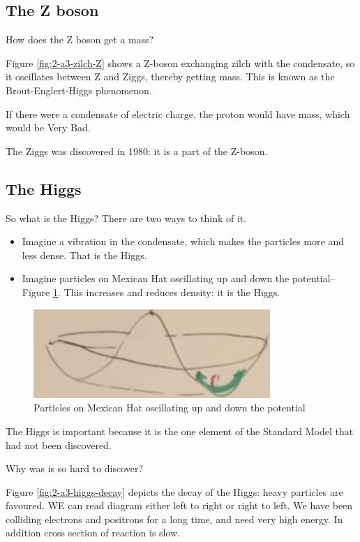 \documentclass[]{article}
\begin{document}
\begin{appendices}
	\subsection{The Z boson}
	
	How does the Z boson get a mass?
	
	Figure \ref{fig:2-a3-zilch-Z} shows a Z-boson exchanging zilch with the condensate, so it oscillates between Z and Ziggs, thereby getting mass. This is known as the Brout-Englert-Higgs phenomenon.
	
	If there were a condensate of electric charge, the proton would have mass, which would be Very Bad.
	
	The Ziggs was discovered in 1980: it is a part of the Z-boson.
	
	\subsection{The Higgs}
	
	So what is the Higgs? There are two ways to think of it.
	\begin{itemize}
		\item Imagine a vibration in the condensate, which makes the particles more and less dense. That is the Higgs.
		\item Imagine particles on Mexican Hat oscillating up and down the potential--Figure \ref{fig:2-a3-higgs1}. This increases and reduces density: it is the Higgs.
	\end{itemize}
	
	\begin{figure}[H]
		\caption{Particles on Mexican Hat oscillating up and down the potential}\label{fig:2-a3-higgs1}
		\includegraphics[width=0.8\textwidth]{2-a3-higgs1}
	\end{figure}

	The Higgs is important because it is the one element of the Standard Model that had not been discovered.
	
	Why was is so hard to discover?
	
	Figure \ref{fig:2-a3-higgs-decay} depicts the decay of the Higgs: heavy particles are favoured. WE can read diagram either left to right or right to left. We have been colliding electrons and positrons for a long time, and need very high energy. In addition cross section of reaction is slow.
	

\end{appendices}
\end{document}
